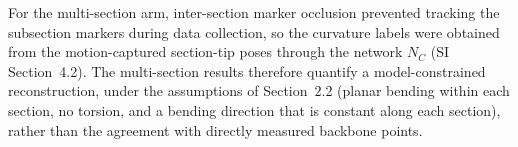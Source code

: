 For the multi-section arm, inter-section marker occlusion prevented tracking the subsection markers during data collection, so the curvature labels were obtained from the motion-captured section-tip poses through the network $N_C$ (SI Section~4.2). The multi-section results therefore quantify a model-constrained reconstruction, under the assumptions of Section~2.2 (planar bending within each section, no torsion, and a bending direction that is constant along each section), rather than the agreement with directly measured backbone points.
